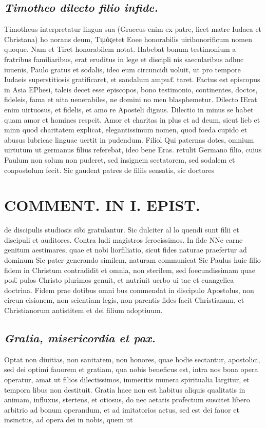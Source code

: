 \documentclass{article}
\begin{document}
\begin{pages}
\subsection*{\textit{Timotheo dilecto filio infide. }}\pstart Timotheus interpretatur lingua sua (Graecus enim ex patre, licet matre Iudaea et Christana) ho norans deum, Τιμόςetet Eoee honorabilis uirihonorificum nomen quoque. Nam et Tiret honorabilem notat. Habebat bonum testimonium a fratribus familiaribus, erat eruditus in lege et discipli nis saecularibus adhuc iuuenis, Paulo gratus et sodalis, ideo eum circuncidi uoluit, ut pro tempore Iudaeis superstitiosis gratificaret, et sandalum ampu£ taret. Factus est episcopus in Asia EPhesi, taleis decet esse episcopos, bono testimonio, continentes, doctos, fideleis, fama et uita uenerabiles, ne domini no men blasphemetur.  \pend\pstart Dilecto IErat enim uirtuosus, et fidelis, et amo re Aposteli dignus. Dilectio in minus se habet quam amor et homines respcit. Amor et charitas in plus et ad deum, sicut lieb et minn quod charitatem explicat, elegantissimum nomen, quod foeda cupido et abusus lubricae linguae uertit in pudendum.  \pend\pstart Filiol Qui paternas dotes, omnium uirtutum ut germanus filius referebat, ideo bene Eras. retulit Germano filio, cuius Paulum non solum non puderet, sed insignem sectatorem, sed sodalem et coapostolum fecit. Sic gaudent patres de filiis sensatis, sic doctores  \pend
\section*{COMMENT. IN I. EPIST. }
\marginpar{[ p.8 ]}\pstart de discipulis studiosis sibi gratulantur. Sic dulciter al lo quendi sunt filii et discipuli et auditores. Contra ludi magistros ferocissimos.  \pend\pstart In fide NNe carne genitum aestimares, quae et nobi liorfiliatio, sicut fides naturae praefertur ad dominum Sic pater generando similem, naturam communicat Sic Paulus huic filio fidem in Christum contradidit et omnia, non sterilem, sed foecundissimam quae po£ pulos Christo plurimos genuit, et nutriuit uerbo ui tae et cuangelica doctrina. Fidem prae dotibus omni bus commendat in discipulo Apostolus, non circun cisionem, non scientiam legis, non parentis fides facit Christianum, et Christianorum antistitem et dei filium adoptiuum.  \pend
{}
{}
\subsection*{\textit{Gratia, misericordia et pax. }}\pstart Optat non diuitias, non sanitatem, non honores, quae hodie sectantur, apostolici, sed dei optimi fauorem et gratiam, qua nobis beneficus est, intra nos bona opera operatur, amat ut filios dilectissimos, immeritis munera spiritualia largitur, et tempora libus non destituit. Gratia haec non est habitus aliquis qualitatis in animam, influxus, stertens, et otiosus, do nec aetatis profectum suscitet libero arbitrio ad bonum operandum, et ad imitatorios actus, sed est dei fauor et insinctus, ad opera dei in nobis, quem ut  \pend

\end{pages}
\end{document}
